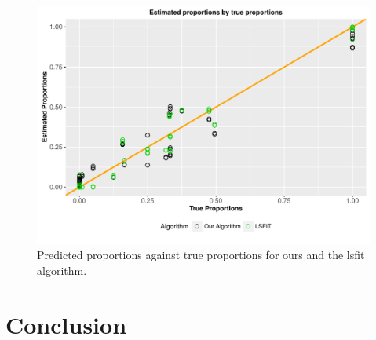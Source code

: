 \documentclass[reqno,12pt,oneside]{report}\usepackage[]{graphicx}\usepackage[]{color}
\makeatletter
\def\maxwidth{ %
  \ifdim\Gin@nat@width>\linewidth
    \linewidth
  \else
    \Gin@nat@width
  \fi
}
\newenvironment{knitrout}{}{} %
\renewenvironment{knitrout}{\begin{small}}{\end{small}}
\theoremstyle{plain}
\theoremstyle{definition}
\theoremstyle{remark}
\numberwithin{theorem}{chapter}     %
\makeatother
\begin{document}
\begin{figure}[ht]
  \centering
\begin{knitrout}
\color{fgcolor}
\includegraphics[width=\maxwidth]{figure/plot3-1} 

\end{knitrout}
\caption{Predicted proportions against true proportions for ours and the lsfit algorithm.}
\label{fig:blood}
\end{figure}







 
 \chapter{Conclusion}
 \label{chap:Conclusion}
\end{document}
